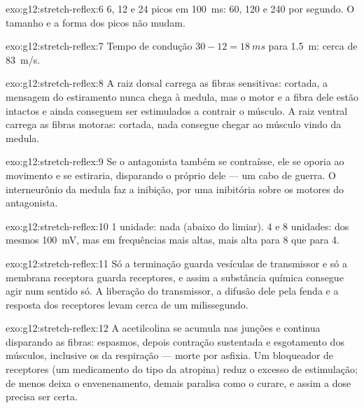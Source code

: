 \begin{solution}{exo:g12:stretch-reflex:6}
6, 12 e 24 picos em \qty{100}{ms}: 60, 120 e 240 por segundo. O tamanho
e a forma dos picos não mudam.
\end{solution}

\begin{solution}{exo:g12:stretch-reflex:7}
Tempo de condução $30 - 12 = \qty{18}{ms}$ para \qty{1.5}{m}: cerca de
\qty{83}{m/s}.
\end{solution}

\begin{solution}{exo:g12:stretch-reflex:8}
A raiz dorsal carrega as fibras sensitivas: cortada, a mensagem do
estiramento nunca chega à medula, mas o  motor e a fibra dele
estão intactos e ainda conseguem ser estimulados a contrair o músculo.
A raiz ventral carrega as fibras motoras: cortada, nada consegue chegar
ao músculo vindo da medula.
\end{solution}

\begin{solution}{exo:g12:stretch-reflex:9}
Se o antagonista também se contraísse, ele se oporia ao movimento e se
estiraria, disparando o próprio  dele --- um cabo de guerra. O
interneurônio da medula faz a inibição, por uma  inibitória
sobre os  motores do antagonista.
\end{solution}

\begin{solution}{exo:g12:stretch-reflex:10}
1 unidade: nada (abaixo do limiar). 4 e 8 unidades: 
dos mesmos \qty{100}{mV}, mas em frequências mais altas, mais alta para
8 que para 4.
\end{solution}

\begin{solution}{exo:g12:stretch-reflex:11}
Só a terminação guarda vesículas de transmissor e só a membrana
receptora guarda receptores, e assim a substância química consegue agir
num sentido só. A liberação do transmissor, a difusão dele pela fenda e
a resposta dos receptores levam cerca de um milissegundo.
\end{solution}

\begin{solution}{exo:g12:stretch-reflex:12}
A acetilcolina se acumula nas junções e continua disparando as fibras:
espasmos, depois contração sustentada e esgotamento dos músculos,
inclusive os da respiração --- morte por asfixia. Um bloqueador de
receptores (um medicamento do tipo da atropina) reduz o excesso de
estimulação; de menos deixa o envenenamento, demais paralisa como o
curare, e assim a dose precisa ser certa.
\end{solution}

